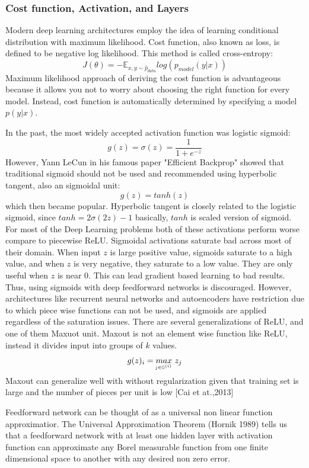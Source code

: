 \documentclass[paper=a4, fontsize=11pt]{scrartcl}
\numberwithin{equation}{section}		%
\numberwithin{figure}{section}			%
\numberwithin{table}{section}			%
\begin{document}
	\subsubsection{Cost function, Activation, and Layers} 
	Modern deep learning architectures employ the idea of learning conditional distribution with maximum likelihood. Cost function, also known as loss, is defined to be negative log likelihood. This method is called cross-entropy:
	$$ J(\theta) = -\mathbb E_{x,y \sim \hat{p}_{data}}log(p_{model}(y|x))$$
	Maximum likelihood approach of deriving the cost function is advantageous because it allows you not to worry about choosing the right function for every model. Instead, cost function is automatically determined by specifying a model $p(y|x)$.
	
	
	In the past, the most widely accepted activation function was logistic sigmoid:
	 $$ g(z) = \sigma(z) = \frac{1}{1 + e^{-z}}$$
	However, Yann LeCun in his famous paper "Efficient Backprop" showed that traditional sigmoid should not be used and recommended using hyperbolic tangent, also an sigmoidal unit:
	$$ g(z) = tanh(z) $$
	which then became popular. Hyperbolic tangent is closely related to the logistic sigmoid, since $tanh = 2\sigma (2z)-1$ basically, $ tanh $ is scaled version of sigmoid. For most of the Deep Learning problems both of these activations perform worse compare to piecewise ReLU. Sigmoidal activations saturate bad across most of their domain. When input $z$ is large positive value, sigmoids saturate to a high value, and when $z$ is very negative, they saturate to a low value. They are only useful when $z$ is near 0. This can lead gradient based learning to bad results. Thus, using sigmoids with deep feedforward networks is discouraged. However, architectures like recurrent neural networks and autoencoders have restriction due to which piece wise functions can not be used, and sigmoids are applied regardless of the saturation issues. There are several generalizations of ReLU, and one of them Maxuot unit. Maxout is not an element wise function like ReLU, instead it divides input into groups of $k$ values. 
		$$ g(z)_i = \underaccent{j \in \mathbb G^{(i)}}{max} \ z_j$$
	Maxout can generalize well with without regularization given that training set is large and the number of pieces per unit is low [Cai et at.,2013]
	\par Feedforward network can be thought of as a universal non linear function approximatior. The Universal Approximation Theorem (Hornik 1989) tells us that a feedforward network with at least one hidden layer with activation function can approximate any Borel measurable function from one finite dimensional space to another with any desired non zero error.
	
\end{document}
